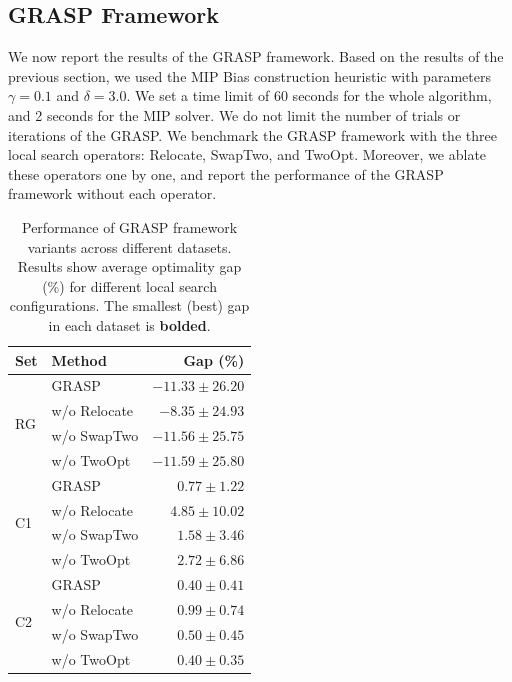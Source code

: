 \subsection{GRASP Framework}

We now report the results of the GRASP framework. 
Based on the results of the previous section, we used the MIP Bias construction heuristic with parameters $\gamma = 0.1$ and $\delta = 3.0$.
We set a time limit of 60 seconds for the whole algorithm, and 2 seconds for the MIP solver.
We do not limit the number of trials or iterations of the GRASP. We benchmark the GRASP framework with the three local search operators: Relocate, SwapTwo, and TwoOpt.
Moreover, we ablate these operators one by one, and report the performance of the GRASP framework without each operator.


\begin{table}[h]
    \caption{Performance of GRASP framework variants across different datasets. Results show average optimality gap (\%) for different local search configurations. The smallest (best) gap in each dataset is \textbf{bolded}.}
    \label{tab:grasp_performance}
    \centering
    \begin{tabular}{llr}
        \toprule
        \textbf{Set} & \textbf{Method} & \textbf{Gap (\%)} \\
        \midrule
        \multirow[c]{4}{*}{RG} 
            & GRASP & $-11.33 \pm 26.20$ \\
            & w/o Relocate & $-8.35 \pm 24.93$ \\
            & w/o SwapTwo & $-11.56 \pm 25.75$ \\
            & w/o TwoOpt & $\mathbf{-11.59 \pm 25.80}$ \\
        \midrule
        \multirow[c]{4}{*}{C1} 
            & GRASP & $\mathbf{0.77 \pm 1.22}$ \\
            & w/o Relocate & $4.85 \pm 10.02$ \\
            & w/o SwapTwo & $1.58 \pm 3.46$ \\
            & w/o TwoOpt & $2.72 \pm 6.86$ \\
        \midrule
        \multirow[c]{4}{*}{C2} 
            & GRASP & $\mathbf{0.40 \pm 0.41}$ \\
            & w/o Relocate & $0.99 \pm 0.74$ \\
            & w/o SwapTwo & $0.50 \pm 0.45$ \\
            & w/o TwoOpt & $\mathbf{0.40 \pm 0.35}$ \\
        \bottomrule
    \end{tabular}
\end{table}

